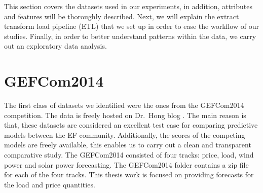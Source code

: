 






This section covers the datasets used in our experiments, in addition, attributes and features will be thoroughly described.
Next, we will explain the extract transform load pipeline (ETL) that we set up in order to ease the workflow of our studies.
Finally, in order to better understand patterns within the data, we carry out an exploratory data analysis.

\section{GEFCom2014}
The first class of datasets we identified were the ones from the GEFCom2014 competition. The data is freely hosted on Dr.\ Hong blog \cite{hong2016probabilistic}.
The main reason is that, these datasets are considered an excellent test case for comparing predictive models between the EF community. Additionally, the scores of the competing models are freely available, this enables us to carry out a clean and transparent comparative study.
The GEFCom2014 consisted of four tracks: price, load, wind power and solar power forecasting. 
The GEFCom2014 folder contains a zip file for each of the four tracks.
This thesis work is focused on providing forecasts for the load and price quantities.
\\

